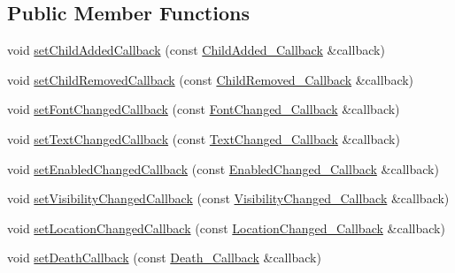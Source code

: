 \subsection*{Public Member Functions}
\begin{DoxyCompactItemize}
\item 
void \mbox{\hyperlink{classec_1_1_generic_widget_listener_a4793ba2548917cad874371e8f18a8558}{set\+Child\+Added\+Callback}} (const \mbox{\hyperlink{classec_1_1_generic_widget_listener_ae374d6d8d2ca9eac9e362a2e587b6ae5}{Child\+Added\+\_\+\+Callback}} \&callback)
\item 
void \mbox{\hyperlink{classec_1_1_generic_widget_listener_addb66fa713fb331a07bff039bc34e6ef}{set\+Child\+Removed\+Callback}} (const \mbox{\hyperlink{classec_1_1_generic_widget_listener_a8b00b7a94ee023680c4af876a5b5a4a5}{Child\+Removed\+\_\+\+Callback}} \&callback)
\item 
void \mbox{\hyperlink{classec_1_1_generic_widget_listener_a1a6db5ae262a196f59ce44c542538205}{set\+Font\+Changed\+Callback}} (const \mbox{\hyperlink{classec_1_1_generic_widget_listener_a996d1f52cd8a7b2b68b65956df295fe4}{Font\+Changed\+\_\+\+Callback}} \&callback)
\item 
void \mbox{\hyperlink{classec_1_1_generic_widget_listener_a69ac0b415f9e2464af67a9244d2be9ff}{set\+Text\+Changed\+Callback}} (const \mbox{\hyperlink{classec_1_1_generic_widget_listener_a1aca43f34a5ccb594026e6acda4236f5}{Text\+Changed\+\_\+\+Callback}} \&callback)
\item 
void \mbox{\hyperlink{classec_1_1_generic_widget_listener_aa6e50d4202cfd4899ffb4d618750b8de}{set\+Enabled\+Changed\+Callback}} (const \mbox{\hyperlink{classec_1_1_generic_widget_listener_aa45e97274cfc832de2b027f94aeaa4c5}{Enabled\+Changed\+\_\+\+Callback}} \&callback)
\item 
void \mbox{\hyperlink{classec_1_1_generic_widget_listener_a038be9f809d684d397bfe80cd55603ae}{set\+Visibility\+Changed\+Callback}} (const \mbox{\hyperlink{classec_1_1_generic_widget_listener_aff589de061ea44ef90ab0fb63ad92477}{Visibility\+Changed\+\_\+\+Callback}} \&callback)
\item 
void \mbox{\hyperlink{classec_1_1_generic_widget_listener_a98add48e4d6159296f70e72068d310b8}{set\+Location\+Changed\+Callback}} (const \mbox{\hyperlink{classec_1_1_generic_widget_listener_ace866e0f10178009a4cdb4868f183316}{Location\+Changed\+\_\+\+Callback}} \&callback)
\item 
void \mbox{\hyperlink{classec_1_1_generic_widget_listener_a2098b05bce52309779603a5711306615}{set\+Death\+Callback}} (const \mbox{\hyperlink{classec_1_1_generic_widget_listener_a9fbdf208fb605a8f9bcaf6f84246118f}{Death\+\_\+\+Callback}} \&callback)

\end{DoxyCompactItemize}
